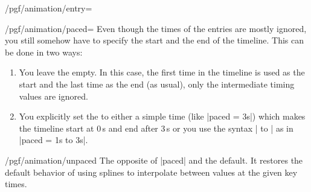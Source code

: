\begin{key}{/pgf/animation/entry=}
\begin{key}{/pgf/animation/paced=}
    Even though the times of the entries are mostly ignored, you still
    somehow have to specify the start and the end of the
    timeline. This can be done in two ways:
    \begin{enumerate}
    \item You leave the  empty. In this case,
      the first time in the timeline is used as the start and the last
      time as the end (as usual), only the intermediate timing values
      are ignored.
    \item You explicitly set the  to either a
      simple time (like |paced = 3s|) which makes the timeline start
      at 0\,s and end after 3\,s or you use the syntax | to | as in |paced = 1s to 3s|.
    \end{enumerate}
\begin{codeexample}[width=2.3cm]
\end{codeexample}
\begin{codeexample}[width=2.3cm]
\end{codeexample}
  \end{key}
  \begin{key}{/pgf/animation/unpaced}
    The opposite of |paced| and the default. It restores the default
    behavior of using splines to interpolate between values at the
    given key times.
  \end{key}
\end{key}


